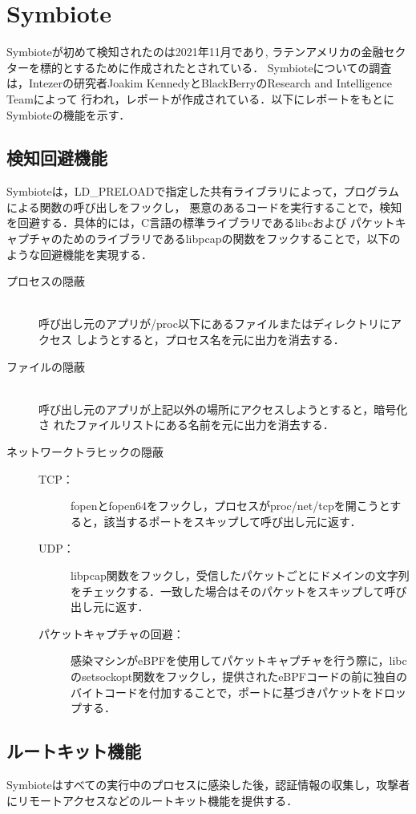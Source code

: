 \documentclass[submit,techreq,noauthor]{eco}	%
\begin{document}
\section{Symbiote}
Symbioteが初めて検知されたのは2021年11月であり,
ラテンアメリカの金融セクターを標的とするために作成されたとされている．
Symbioteについての調査は，Intezerの研究者Joakim KennedyとBlackBerryのResearch and Intelligence Teamによって
行われ，レポートが作成されている．以下にレポートをもとにSymbioteの機能を示す．


\subsection{検知回避機能}
Symbioteは，LD\_PRELOADで指定した共有ライブラリによって，プログラムによる関数の呼び出しをフックし，
悪意のあるコードを実行することで，検知を回避する．具体的には，C言語の標準ライブラリであるlibcおよび
パケットキャプチャのためのライブラリであるlibpcapの関数をフックすることで，以下のような回避機能を実現する．
  \begin{description}
    \item [プロセスの隠蔽] \mbox{}\\
    呼び出し元のアプリが/proc以下にあるファイルまたはディレクトリにアクセス
    しようとすると，プロセス名を元に出力を消去する．
    \item [ファイルの隠蔽] \mbox{}\\
    呼び出し元のアプリが上記以外の場所にアクセスしようとすると，暗号化さ
    れたファイルリストにある名前を元に出力を消去する．
    \item [ネットワークトラヒックの隠蔽] \mbox{}
      \begin{description}
        \item[TCP：] 
        fopenとfopen64をフックし，プロセスがproc/net/tcpを開こうとすると，該当するポートをスキップして呼び出し元に返す．
        \item[UDP：] 
        libpcap関数をフックし，受信したパケットごとにドメインの文字列をチェックする．一致した場合はそのパケットをスキップして呼び出し元に返す．
        \item[パケットキャプチャの回避：] 感染マシンがeBPFを使用してパケットキャプチャを行う際に，libc
        のsetsockopt関数をフックし，提供されたeBPFコードの前に独自のバイトコードを付加することで，ポートに基づきパケットをドロップする．
      \end{description}
  \end{description}

\subsection{ルートキット機能}
Symbioteはすべての実行中のプロセスに感染した後，認証情報の収集し，攻撃者にリモートアクセスなどのルートキット機能を提供する．
\end{document}
